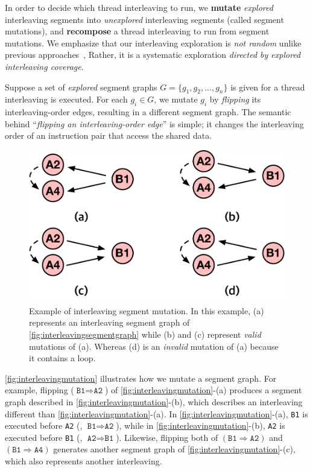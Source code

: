 In order to decide which thread interleaving to run, we
\textbf{mutate} \textit{explored} interleaving segments into
\textit{unexplored} interleaving segments (called segment mutations),
and \textbf{recompose} a thread interleaving to run from segment
mutations.
%
We emphasize that our interleaving exploration is \textit{not random}
unlike previous approaches~\cite{krace, ski, pctalgorithm, muzz},
Rather, it is a systematic exploration \textit{directed by explored
  interleaving coverage}.
%


%
Suppose a set of \textit{explored} segment graphs
$G = \{g_1, g_2, ..., g_n \}$ is given for a thread interleaving is
executed.
%
For each $g_i \in G$, we mutate $g_i$ by \textit{flipping} its
interleaving-order edges, resulting in a different segment graph.
%
The semantic behind ``\textit{flipping an interleaving-order edge}''
is simple; it changes the interleaving order of an instruction pair
that access the shared data.




\begin{figure}[t]
  \centering
  \includegraphics[width=0.7\linewidth]{fig/interleavingmutation.pdf}
  \caption{Example of interleaving segment mutation. In this example,
    (a) represents an interleaving segment graph of
    \autoref{fig:interleavingsegmentgraph} while (b) and (c) represent
    \textit{valid} mutations of (a). Whereas (d) is an
    \textit{invalid} mutation of (a) because it contains a loop.}
  \label{fig:interleavingmutation}
\end{figure}
%
\autoref{fig:interleavingmutation} illustrates how we mutate a segment
graph.
%
For example, flipping ($\texttt{B1} \Rightarrow \texttt{A2}$) of
\autoref{fig:interleavingmutation}-(a) produces a segment graph
described in \autoref{fig:interleavingmutation}-(b), which describes
an interleaving different than \autoref{fig:interleavingmutation}-(a).
%
In \autoref{fig:interleavingmutation}-(a), \texttt{B1} is executed
before \texttt{A2} (\ie, $\texttt{B1} \Rightarrow \texttt{A2}$), while
in \autoref{fig:interleavingmutation}-(b), \texttt{A2} is executed
before \texttt{B1} (\ie, $\texttt{A2} \Rightarrow \texttt{B1}$).
%
Likewise, flipping both of $(\texttt{B1} \Rightarrow \texttt{A2})$ and
$(\texttt{B1} \Rightarrow \texttt{A4})$ generates another segment
graph of \autoref{fig:interleavingmutation}-(c), which also represents
another interleaving.

